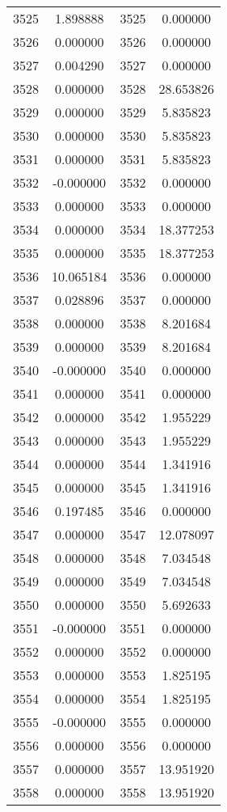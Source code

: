 \documentclass[12pt]{article}
\begin{document}
\begin{longtable}{@{}cccc@{}}
3525 & 1.898888 & 3525 & 0.000000 \\
3526 & 0.000000 & 3526 & 0.000000 \\
3527 & 0.004290 & 3527 & 0.000000 \\
3528 & 0.000000 & 3528 & 28.653826 \\
3529 & 0.000000 & 3529 & 5.835823 \\
3530 & 0.000000 & 3530 & 5.835823 \\
3531 & 0.000000 & 3531 & 5.835823 \\
3532 & -0.000000 & 3532 & 0.000000 \\
3533 & 0.000000 & 3533 & 0.000000 \\
3534 & 0.000000 & 3534 & 18.377253 \\
3535 & 0.000000 & 3535 & 18.377253 \\
3536 & 10.065184 & 3536 & 0.000000 \\
3537 & 0.028896 & 3537 & 0.000000 \\
3538 & 0.000000 & 3538 & 8.201684 \\
3539 & 0.000000 & 3539 & 8.201684 \\
3540 & -0.000000 & 3540 & 0.000000 \\
3541 & 0.000000 & 3541 & 0.000000 \\
3542 & 0.000000 & 3542 & 1.955229 \\
3543 & 0.000000 & 3543 & 1.955229 \\
3544 & 0.000000 & 3544 & 1.341916 \\
3545 & 0.000000 & 3545 & 1.341916 \\
3546 & 0.197485 & 3546 & 0.000000 \\
3547 & 0.000000 & 3547 & 12.078097 \\
3548 & 0.000000 & 3548 & 7.034548 \\
3549 & 0.000000 & 3549 & 7.034548 \\
3550 & 0.000000 & 3550 & 5.692633 \\
3551 & -0.000000 & 3551 & 0.000000 \\
3552 & 0.000000 & 3552 & 0.000000 \\
3553 & 0.000000 & 3553 & 1.825195 \\
3554 & 0.000000 & 3554 & 1.825195 \\
3555 & -0.000000 & 3555 & 0.000000 \\
3556 & 0.000000 & 3556 & 0.000000 \\
3557 & 0.000000 & 3557 & 13.951920 \\
3558 & 0.000000 & 3558 & 13.951920 \\

\end{longtable}
\end{document}
